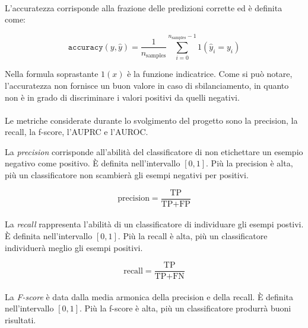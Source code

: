 \documentclass[12pt,a4paper,oneside,hidelinks]{report}
\begin{document}
\paragraph*{}
L'accuratezza corrisponde alla frazione delle predizioni corrette ed è definita come:

\begin{equation}
\texttt{accuracy}(y, \hat{y}) = \frac{1}{n_\text{samples}} \sum_{i=0}^{n_\text{samples}-1} 1(\hat{y}_i = y_i)
\end{equation}

Nella formula soprastante $1(x)$ è la funzione indicatrice. Come si può notare, l'accuratezza non fornisce un buon valore in caso di sbilanciamento, in quanto non è in grado di discriminare i valori positivi da quelli negativi.

\paragraph*{}
Le metriche considerate durante lo svolgimento del progetto sono la precision, la recall, la f-score, l'AUPRC e l'AUROC.

La \textit{precision} corrisponde all'abilità del classificatore di non etichettare un esempio negativo come positivo. È definita nell'intervallo $[0,1]$. Più la precision è alta, più un classificatore non scambierà gli esempi negativi per positivi.

\begin{equation}
\text{precision} = \frac{\text{TP}}{\text{TP} + \text{FP}}
\end{equation}

\paragraph*{}
La \textit{recall} rappresenta l'abilità di un classificatore di individuare gli esempi postivi. È definita nell'intervallo $[0,1]$. Più la recall è alta, più un classificatore individuerà meglio gli esempi positivi.

\begin{equation}
\text{recall} = \frac{\text{TP}}{\text{TP} + \text{FN}}
\end{equation}

\paragraph*{}
La \textit{F-score} è data dalla media armonica della precision e della recall. È definita nell'intervallo $[0,1]$. Più la f-score è alta, più un classificatore produrrà buoni risultati.
\end{document}
